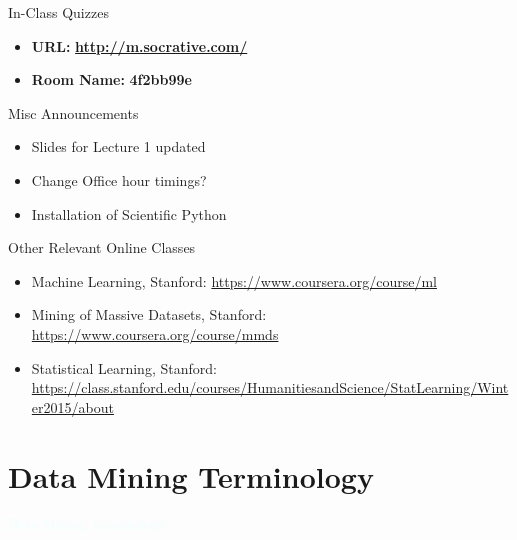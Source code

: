 \documentclass{beamer}
\newcommand{\thblue}[1]{{\Huge {\textcolor{azure}{#1}}}}
\begin{document}
\begin{frame}{In-Class Quizzes}
\begin{itemize}
\item {\Large {\bf URL:}} {\LARGE \bf \url{http://m.socrative.com/}} 
\item {\Large {\bf Room Name:} {\LARGE \bf 4f2bb99e}}
\end{itemize}
\end{frame}

\begin{frame}{Misc Announcements}                                                                                              
    \begin{itemize}                                                                                                          
        \item Slides for Lecture 1 updated
        \item Change Office hour timings? 
        \item Installation of Scientific Python
    \end{itemize}                                                                                                            
\end{frame}   

\begin{frame}{Other Relevant Online Classes} 
    \begin{itemize}                                                                                                          
        \item Machine Learning, Stanford: \url{https://www.coursera.org/course/ml}
        \item Mining of Massive Datasets, Stanford: \url{https://www.coursera.org/course/mmds}
        \item Statistical Learning, Stanford: \url{https://class.stanford.edu/courses/HumanitiesandScience/StatLearning/Winter2015/about}
    \end{itemize}                                                                                                            
\end{frame}   


\section{Data Mining Terminology}
\begin{frame}{}                                                                                                              
    \begin{center}                                                                                                           
        \thblue{Data Mining Terminology}                                                                         
    \end{center}                                                                                                             
\end{frame}                                                                                                                  
\end{document}

